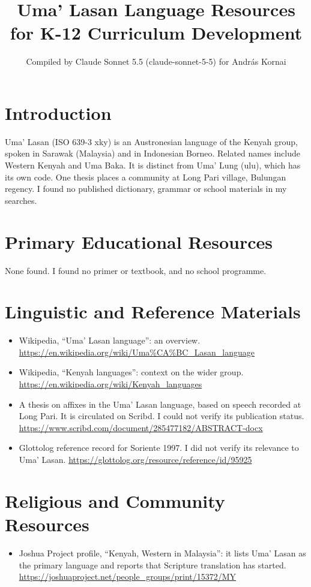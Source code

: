 \documentclass[12pt]{article}
\title{Uma' Lasan Language Resources for K-12 Curriculum Development}
\author{Compiled by Claude Sonnet 5.5 (claude-sonnet-5-5) for Andr\'as Kornai}
\date{}
\begin{document}
\maketitle

\section{Introduction}
Uma' Lasan (ISO 639-3 xky) is an Austronesian language of the Kenyah group, spoken in Sarawak (Malaysia) and in Indonesian Borneo. Related names include Western Kenyah and Uma Baka. It is distinct from Uma' Lung (ulu), which has its own code. One thesis places a community at Long Pari village, Bulungan regency. I found no published dictionary, grammar or school materials in my searches.

\section{Primary Educational Resources}
None found. I found no primer or textbook, and no school programme.

\section{Linguistic and Reference Materials}
\begin{itemize}
\item Wikipedia, ``Uma' Lasan language'': an overview. \url{https://en.wikipedia.org/wiki/Uma%CA%BC_Lasan_language}
\item Wikipedia, ``Kenyah languages'': context on the wider group. \url{https://en.wikipedia.org/wiki/Kenyah_languages}
\item A thesis on affixes in the Uma' Lasan language, based on speech recorded at Long Pari. It is circulated on Scribd. I could not verify its publication status. \url{https://www.scribd.com/document/285477182/ABSTRACT-docx}
\item Glottolog reference record for Soriente 1997. I did not verify its relevance to Uma' Lasan. \url{https://glottolog.org/resource/reference/id/95925}
\end{itemize}

\section{Religious and Community Resources}
\begin{itemize}
\item Joshua Project profile, ``Kenyah, Western in Malaysia'': it lists Uma' Lasan as the primary language and reports that Scripture translation has started. \url{https://joshuaproject.net/people_groups/print/15372/MY}
\end{itemize}
\end{document}
